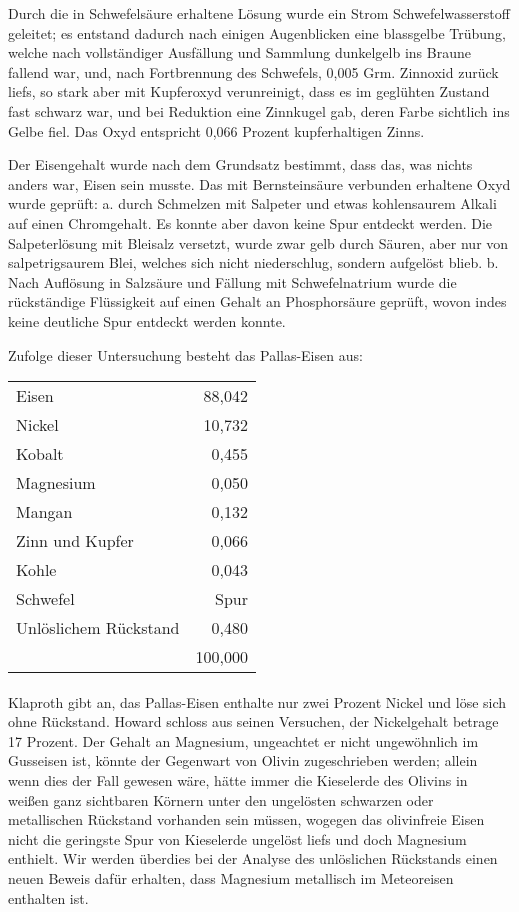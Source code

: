 \documentclass[a4paper, 11pt, oneside]{article}
\begin{document}
Durch die in Schwefelsäure erhaltene Lösung wurde ein Strom Schwefelwasserstoff geleitet; es entstand dadurch nach einigen Augenblicken eine blassgelbe Trübung, welche nach vollständiger Ausfällung und Sammlung dunkelgelb ins Braune fallend war, und, nach Fortbrennung des Schwefels, 0,005 Grm. Zinnoxid zurück liefs, so stark aber mit Kupferoxyd verunreinigt, dass es im geglühten Zustand fast schwarz war, und bei Reduktion eine Zinnkugel gab, deren Farbe sichtlich ins Gelbe fiel. Das Oxyd entspricht 0,066 Prozent kupferhaltigen Zinns.

Der Eisengehalt wurde nach dem Grundsatz bestimmt, dass das, was nichts anders war, Eisen sein musste. Das mit Bernsteinsäure verbunden erhaltene Oxyd wurde geprüft: a. durch Schmelzen mit Salpeter und etwas kohlensaurem Alkali auf einen Chromgehalt. Es konnte aber davon keine Spur entdeckt werden. Die Salpeterlösung mit Bleisalz versetzt, wurde zwar gelb durch Säuren, aber nur von salpetrigsaurem Blei, welches sich nicht niederschlug, sondern aufgelöst blieb. b. Nach Auflösung in Salzsäure und Fällung mit Schwefelnatrium wurde die rückständige Flüssigkeit auf einen Gehalt an Phosphorsäure geprüft, wovon indes keine deutliche Spur entdeckt werden konnte.

Zufolge dieser Untersuchung besteht das Pallas-Eisen aus:
\begin{center}
\begin{tabular}{ l r }
    Eisen & 88,042\\
    Nickel & 10,732\\
    Kobalt & 0,455\\
    Magnesium & 0,050\\
    Mangan & 0,132\\
    Zinn und Kupfer & 0,066\\
    Kohle & 0,043\\
    Schwefel & Spur\\
    Unlöslichem Rückstand & 0,480\\
    & 100,000\\
\end{tabular}
\end{center}
\paragraph{}
Klaproth gibt an, das Pallas-Eisen enthalte nur zwei Prozent Nickel und löse sich ohne Rückstand. Howard schloss aus seinen Versuchen, der Nickelgehalt betrage 17 Prozent. Der Gehalt an Magnesium, ungeachtet er nicht ungewöhnlich im Gusseisen ist, könnte der Gegenwart von Olivin zugeschrieben werden; allein wenn dies der Fall gewesen wäre, hätte immer die Kieselerde des Olivins in weißen ganz sichtbaren Körnern unter den ungelösten schwarzen oder metallischen Rückstand vorhanden sein müssen, wogegen das olivinfreie Eisen nicht die geringste Spur von Kieselerde ungelöst liefs und doch Magnesium enthielt. Wir werden überdies bei der Analyse des unlöslichen Rückstands einen neuen Beweis dafür erhalten, dass Magnesium metallisch im Meteoreisen enthalten ist.
\end{document}
